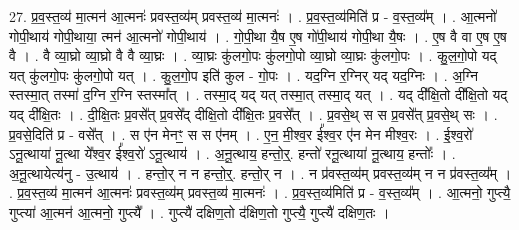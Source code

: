 \documentclass[17pt]{extarticle}
\begin{document}
27. प्र॒व॒स्त॒व्य॑ मा॒त्मन॑ आ॒त्मनः॑ प्रवस्त॒व्य॑म् प्रवस्त॒व्य॑ मा॒त्मनः॑ । . प्र॒व॒स्त॒व्य॑मिति॑ प्र - व॒स्त॒व्य᳚म् । . आ॒त्मनो॑ गोपी॒थाय॑ गोपी॒थाया॒ त्मन॑ आ॒त्मनो॑ गोपी॒थाय॑ । . गो॒पी॒था यै॒ष ए॒ष गो॑पी॒थाय॑ गोपी॒था यै॒षः । . ए॒ष वै वा ए॒ष ए॒ष वै । . वै व्या॒घ्रो व्या॒घ्रो वै वै व्या॒घ्रः । . व्या॒घ्रः कु॑लगो॒पः कु॑लगो॒पो व्या॒घ्रो व्या॒घ्रः कु॑लगो॒पः । . कु॒ल॒गो॒पो यद् यत् कु॑लगो॒पः कु॑लगो॒पो यत् । . कु॒ल॒गो॒प इति॑ कुल - गो॒पः । . यद॒ग्नि र॒ग्निर् यद् यद॒ग्निः । . अ॒ग्नि स्तस्मा॒त् तस्मा॑ द॒ग्नि र॒ग्नि स्तस्मा᳚त् । . तस्मा॒द् यद् यत् तस्मा॒त् तस्मा॒द् यत् । . यद् दी᳚क्षि॒तो दी᳚क्षि॒तो यद् यद् दी᳚क्षि॒तः । . दी॒क्षि॒तः प्र॒वसे᳚त् प्र॒वसे᳚द् दीक्षि॒तो दी᳚क्षि॒तः प्र॒वसे᳚त् । . प्र॒वसे॒थ् स स प्र॒वसे᳚त् प्र॒वसे॒थ् सः । . प्र॒वसे॒दिति॑ प्र - वसे᳚त् । . स ए॑न मेनꣳ॒॒ स स ए॑नम् । . ए॒न॒ मी॒श्व॒र ई᳚श्व॒र ए॑न मेन मीश्व॒रः । . ई॒श्व॒रो॑ ऽनू॒त्थाया॑ नू॒त्था ये᳚श्व॒र ई᳚श्व॒रो॑ ऽनू॒त्थाय॑ । . अ॒नू॒त्थाय॒ हन्तो॒र्॒. हन्तो॑ रनू॒त्थाया॑ नू॒त्थाय॒ हन्तोः᳚ । . अ॒नू॒त्थायेत्य॑नु - उ॒त्थाय॑ । . हन्तो॒र् न न हन्तो॒र्॒. हन्तो॒र् न । . न प्र॑वस्त॒व्य॑म् प्रवस्त॒व्य॑म् न न प्र॑वस्त॒व्य᳚म् । . प्र॒व॒स्त॒व्य॑ मा॒त्मन॑ आ॒त्मनः॑ प्रवस्त॒व्य॑म् प्रवस्त॒व्य॑ मा॒त्मनः॑ । . प्र॒व॒स्त॒व्य॑मिति॑ प्र - व॒स्त॒व्य᳚म् । . आ॒त्मनो॒ गुप्त्यै॒ गुप्त्या॑ आ॒त्मन॑ आ॒त्मनो॒ गुप्त्यै᳚ । . गुप्त्यै॑ दक्षिण॒तो द॑क्षिण॒तो गुप्त्यै॒ गुप्त्यै॑ दक्षिण॒तः । \newline
\end{document}
